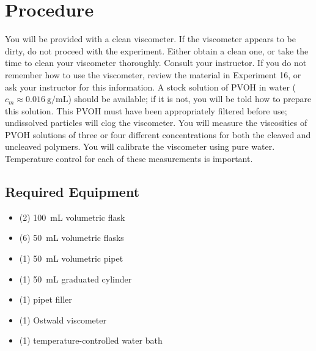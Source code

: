\section{Procedure} %
\label{sec:procedure}

You will be provided with a clean viscometer. 
If the viscometer appears to be dirty, do not proceed with the experiment. 
Either obtain a clean one, or take the time to clean your viscometer thoroughly. 
Consult your instructor. 
If you do not remember how to use the viscometer, review the material in Experiment 16, or ask your instructor for this information. 
A stock solution of PVOH in water (\( c_m \approx \qty{0.016}{\g \per \mL} \)) should be available; if it is not, you will be told how to prepare this solution. 
This PVOH must have been appropriately filtered before use; undissolved particles will clog the viscometer. 
You will measure the viscosities of PVOH solutions of three or four different concentrations for both the cleaved and uncleaved polymers. 
You will calibrate the viscometer using pure water. 
Temperature control for each of these measurements is important.

\subsection{Required Equipment} %
\label{sub:required_equipment}

\begin{itemize}
	\item (2) \qty{100}{\mL} volumetric flask
	\item (6) \qty{50}{\mL} volumetric flasks
	\item (1) \qty{50}{\mL} volumetric pipet
	\item (1) \qty{50}{\mL} graduated cylinder
	\item (1) pipet filler
	\item (1) Ostwald viscometer
	\item (1) temperature-controlled water bath
\end{itemize}


